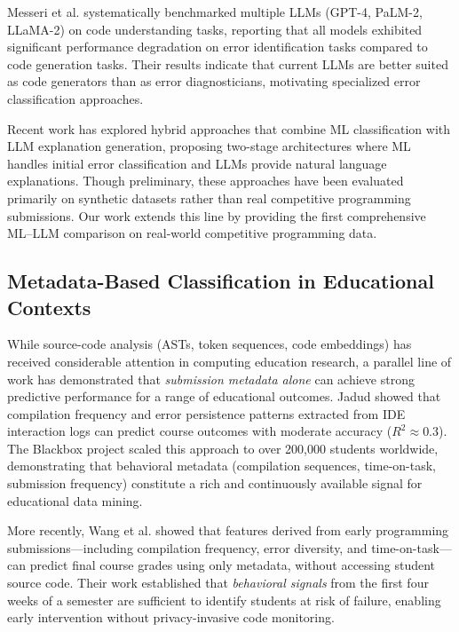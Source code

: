 \documentclass[10pt,letterpaper]{article}
\begin{document}
Messeri et al. \cite{prather2024code} systematically benchmarked multiple
LLMs (GPT-4, PaLM-2, LLaMA-2) on code understanding tasks, reporting that
all models exhibited significant performance degradation on error
identification tasks compared to code generation tasks. Their results indicate
that current LLMs are better suited as code generators than as error
diagnosticians, motivating specialized error classification
approaches.

Recent work has explored hybrid approaches that combine ML classification
with LLM explanation generation, proposing two-stage architectures where
ML handles initial error classification and LLMs provide natural language
explanations. Though preliminary, these approaches have been evaluated primarily
on synthetic datasets rather than real competitive programming submissions.
Our work extends this line by providing the first comprehensive ML--LLM
comparison on real-world competitive programming data.

\subsection{Metadata-Based Classification in Educational Contexts}

While source-code analysis (ASTs, token sequences, code embeddings) has
received considerable attention in computing education research, a parallel
line of work has demonstrated that \textit{submission metadata alone} can
achieve strong predictive performance for a range of educational outcomes.
Jadud \cite{jadud2006methods} showed that compilation frequency and
error persistence patterns extracted from IDE interaction logs can predict
course outcomes with moderate accuracy ($R^2 \approx 0.3$). The Blackbox
project \cite{bey2022analyzing} scaled this approach to over 200,000
students worldwide, demonstrating that behavioral metadata (compilation
sequences, time-on-task, submission frequency) constitute a rich and
continuously available signal for educational data mining.

More recently, Wang et al. \cite{wang2017learning} showed that features
derived from early programming submissions—including compilation frequency,
error diversity, and time-on-task—can predict final course grades using
only metadata, without accessing student source code. Their work established
that \textit{behavioral signals} from the first four weeks of a semester
are sufficient to identify students at risk of failure, enabling early
intervention without privacy-invasive code monitoring.
\end{document}
